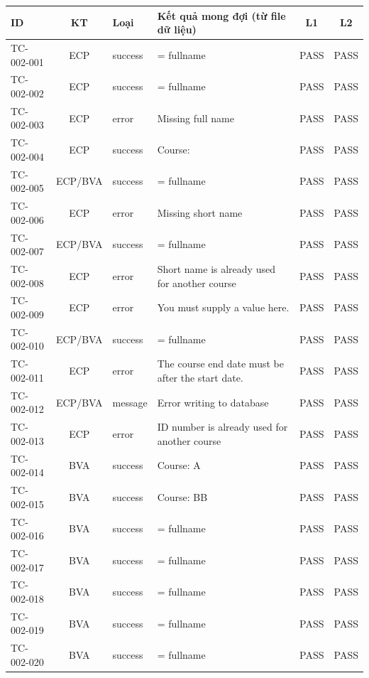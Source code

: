 {\footnotesize\begin{longtable}{|l|c|L{1.4cm}|L{6.0cm}|c|c|}\hline
{}\textbf{ID} & \textbf{KT} & \textbf{Loại} & \textbf{Kết quả mong đợi (từ file dữ liệu)} & \textbf{L1} & \textbf{L2} \\ \hline\endhead
TC-002-001 & ECP & success & = fullname & PASS & PASS \\ \hline
TC-002-002 & ECP & success & = fullname & PASS & PASS \\ \hline
TC-002-003 & ECP & error & Missing full name & PASS & PASS \\ \hline
TC-002-004 & ECP & success & Course: \textbar{} & PASS & PASS \\ \hline
TC-002-005 & ECP/\allowbreak{}BVA & success & = fullname & PASS & PASS \\ \hline
TC-002-006 & ECP & error & Missing short name & PASS & PASS \\ \hline
TC-002-007 & ECP/\allowbreak{}BVA & success & = fullname & PASS & PASS \\ \hline
TC-002-008 & ECP & error & Short name is already used for another course & PASS & PASS \\ \hline
TC-002-009 & ECP & error & You must supply a value here. & PASS & PASS \\ \hline
TC-002-010 & ECP/\allowbreak{}BVA & success & = fullname & PASS & PASS \\ \hline
TC-002-011 & ECP & error & The course end date must be after the start date. & PASS & PASS \\ \hline
TC-002-012 & ECP/\allowbreak{}BVA & message & Error writing to database & PASS & PASS \\ \hline
TC-002-013 & ECP & error & ID number is already used for another course & PASS & PASS \\ \hline
TC-002-014 & BVA & success & Course: A \textbar{} & PASS & PASS \\ \hline
TC-002-015 & BVA & success & Course: BB \textbar{} & PASS & PASS \\ \hline
TC-002-016 & BVA & success & = fullname & PASS & PASS \\ \hline
TC-002-017 & BVA & success & = fullname & PASS & PASS \\ \hline
TC-002-018 & BVA & success & = fullname & PASS & PASS \\ \hline
TC-002-019 & BVA & success & = fullname & PASS & PASS \\ \hline
TC-002-020 & BVA & success & = fullname & PASS & PASS \\ \hline

\end{longtable}}
